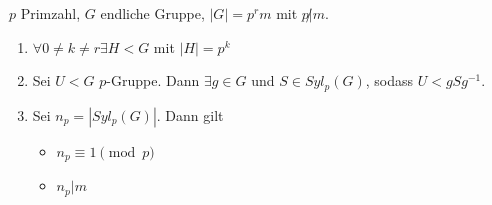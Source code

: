 \documentclass[12pt,a4paper]{scrartcl}
\begin{document}
\begin{satz}[Sylowsätze]
	$p$ Primzahl, $G$ endliche Gruppe, $|G| = p^rm$ mit $p\not|m$.\begin{enumerate}
		\item $\forall 0\neq k\neq r\exists H<G$ mit $|H| = p^k$
		\item Sei $U<G$ $p$-Gruppe. Dann $\exists g\in G$ und $S\in Syl_p(G)$, sodass $U<gSg^{-1}$.
		\item Sei $n_p = |Syl_p(G)|$. Dann gilt \begin{itemize}
			\item $n_p\equiv 1\pmod p$
			\item $n_p|m$
		\end{itemize}
	\end{enumerate}
\end{satz}
\end{document}

